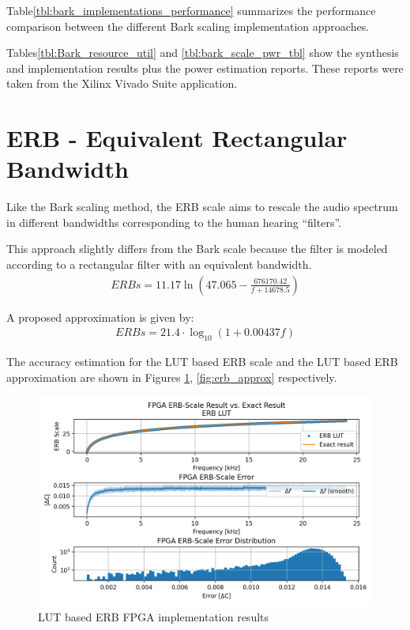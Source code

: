 Table\;\ref{tbl:bark_implementations_performance} summarizes
the performance comparison between the different Bark scaling
implementation approaches. 

Tables\;\ref{tbl:Bark_resource_util} and \ref{tbl:bark_scale_pwr_tbl}
show the synthesis and implementation results 
plus the power estimation reports. 
These reports were taken from the Xilinx Vivado Suite application.

\section{ERB - Equivalent Rectangular Bandwidth}
Like the Bark scaling method, the ERB scale aims 
to rescale the audio spectrum in different 
bandwidths corresponding to the human hearing ``filters''.

This approach slightly differs from the Bark scale
because the filter is modeled according
to a rectangular filter with an equivalent
bandwidth.
\begin{align}\label{eq:erb_eq}
    ERBs = 11.17\ln (47.065 - \frac{676170.42}{f + 14678.5})    
\end{align}

A proposed approximation is given by:
\begin{align}\label{eq:erb_approx_eq}
    ERBs = 21.4 \cdot \log_{10} (1 + 0.00437f)    
\end{align}


The accuracy estimation for the LUT based ERB scale
and the LUT based ERB approximation are shown in Figures 
\ref{fig:erb_fpga}, \ref{fig:erb_approx} respectively.

\begin{figure}[H]
    \centering
    \includegraphics[width=0.75\linewidth]{Scaling/images/erb}
    \caption{LUT based ERB FPGA implementation results}\label{fig:erb_fpga}
\end{figure}

